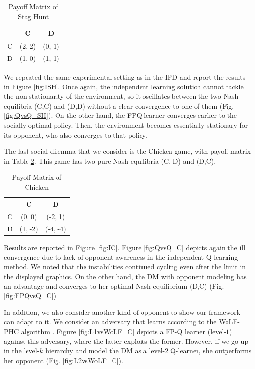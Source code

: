 \documentclass[letterpaper]{article} %
\begin{document}
\begin{table}[h!]
\begin{center}
\begin{tabular}{c|c|c}
\hline
 & C & D \\
\hline
C & (2, 2) & (0, 1) \\
\hline
D & (1, 0) & (1, 1)  \\
\hline
\end{tabular}
\end{center}
\caption{Payoff Matrix of Stag Hunt}
\label{tab:payoffSG}
\end{table}
We repeated the same experimental setting as in the IPD and report the results in Figure \ref{fig:ISH}. Once again, the independent learning solution cannot
tackle the non-stationarity of the environment, so it oscillates between the two Nash equilibria (C,C) and (D,D) without a clear convergence to one of them (Fig. \ref{fig:QvsQ_SH}). On the other hand, the FPQ-learner converges earlier to the socially optimal policy. Then, the environment becomes essentially stationary for its opponent, who also converges to that policy.




The last social dilemma that we consider is the Chicken game, with payoff matrix in Table \ref{tab:payoffC}. This game has two pure Nash equilibria (C, D) and (D,C).

\begin{table}[h!]
\begin{center}
\begin{tabular}{c|c|c}
\hline
 & C & D \\
\hline
C & (0, 0) & (-2, 1) \\
\hline
D & (1, -2) & (-4, -4)  \\
\hline
\end{tabular}
\end{center}
\caption{Payoff Matrix of Chicken}
\label{tab:payoffC}
\end{table}
Results are reported in Figure \ref{fig:IC}. Figure \ref{fig:QvsQ_C} depicts again the ill convergence due to lack of opponent awareness in the independent Q-learning method. We noted that the instabilities continued cycling even after the limit in the displayed graphics. On the other hand, the DM with opponent modeling has an advantage and converges to her optimal Nash equilibrium (D,C) (Fig. \ref{fig:FPQvsQ_C}).

{\color{black}
In addition, we also consider another kind of opponent to show our framework can adapt to it. We consider an adversary that learns according to the WoLF-PHC algorithm \cite{bowling2001rational}. Figure \ref{fig:L1vsWoLF_C} depicts a FP-Q learner (level-$1$) against this adversary, where the latter exploits the former. However, if we go up in the level-$k$ hierarchy and model the DM as a level-$2$ Q-learner, she outperforms her opponent (Fig. \ref{fig:L2vsWoLF_C}).}
\end{document}
